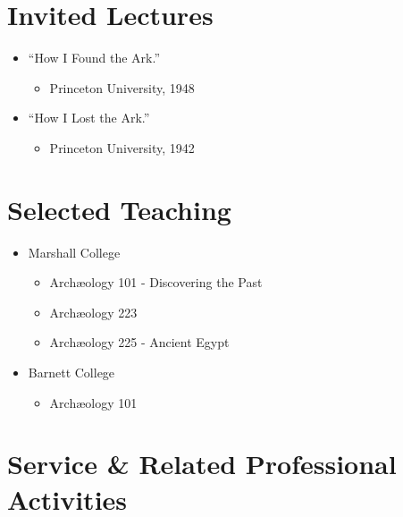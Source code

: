 \documentclass[%
    11pt,
  oneside
  ]{memoir}
\begin{document}
\begin{adjustwidth*}{9em}{0em}
\hypertarget{invited-lectures}{%
\section{Invited Lectures}\label{invited-lectures}}

\begin{itemize}
\tightlist
\item
  ``How I Found the Ark.''

  \begin{itemize}
  \tightlist
  \item
    Princeton University, 1948
  \end{itemize}
\item
  ``How I Lost the Ark.''

  \begin{itemize}
  \tightlist
  \item
    Princeton University, 1942
  \end{itemize}
\end{itemize}

\hypertarget{selected-teaching}{%
\section{Selected Teaching}\label{selected-teaching}}

\begin{itemize}
\tightlist
\item
  Marshall College

  \begin{itemize}
  \tightlist
  \item
    Archæology 101 - Discovering the Past
  \item
    Archæology 223
  \item
    Archæology 225 - Ancient Egypt
  \end{itemize}
\item
  Barnett College

  \begin{itemize}
  \tightlist
  \item
    Archæology 101
  \end{itemize}
\end{itemize}

\hypertarget{service-related-professional-activities}{%
\section{Service \& Related Professional
Activities}\label{service-related-professional-activities}}


\end{adjustwidth*}
\end{document}
